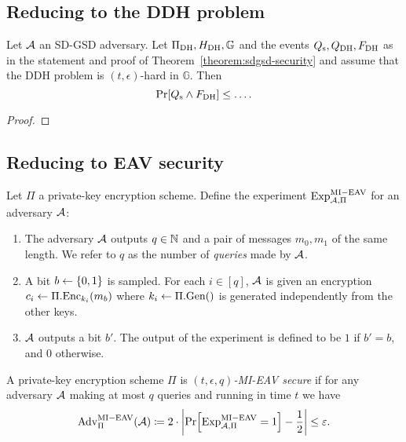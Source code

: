 \subsection{Reducing to the DDH problem}

\begin{lemma} \label{lemma:dh-reduction}
	Let $\mathcal{A}$ an SD-GSD adversary. Let $\Pi_{\mathrm{DH}}, H_\mathrm{DH}, \mathbb{G}$ and the events $Q_\mathrm{s}, Q_\mathrm{DH}, F_\mathrm{DH}$ as in the statement and proof of Theorem~\vref{theorem:sdgsd-security} and assume that the DDH problem is $(t, \epsilon)$-hard in $\mathbb{G}$. Then
	\[
		\pr{\qs \land \fdh} \le \ldots.
	\]
\end{lemma}
\begin{proof}
\end{proof}

\subsection{Reducing to EAV security}


\begin{definition}
	Let $\Pi$ a private-key encryption scheme. Define the experiment $\mathrm{Exp}_{\mathcal{A}, \Pi}^{\mathrm{MI-EAV}}$ for an adversary $\mathcal{A}$:
	\begin{enumerate}[1.]
		\item The adversary $\mathcal{A}$ outputs $q \in \mathbb{N}$ and a pair of messages $m_0, m_1$ of the same length. We refer to $q$ as the number of \emph{queries} made by $\mathcal{A}$.
		\item A bit $b \leftarrow \{0, 1\}$ is sampled. For each $i \in [q]$, $\mathcal{A}$ is given an encryption $c_i \leftarrow \Pi.\mathrm{Enc}_{k_i}(m_b)$ where $k_i \leftarrow \Pi.\mathrm{Gen}()$ is generated independently from the other keys.
		\item $\mathcal{A}$ outputs a bit $b'$. The output of the experiment is defined to be $1$ if $b' = b$, and $0$ otherwise.
	\end{enumerate}
\end{definition}

\begin{definition}
	A private-key encryption scheme $\Pi$ is \emph{$(t, \epsilon, q)$-MI-EAV secure} if for any adversary $\mathcal{A}$ making at most $q$ queries and running in time $t$ we have
	\begin{align*}
		\mathrm{Adv}_{\Pi}^{\mathrm{MI-EAV}}(\adv) \coloneqq 2 \cdot \abs*{\pr{\mathrm{Exp}_{\adv, \Pi}^{\mathrm{MI-EAV}} = 1} - \frac{1}{2}} \le \epsilon.
	\end{align*}
\end{definition}

